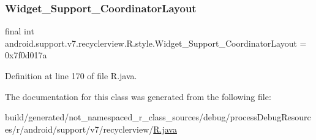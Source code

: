 \subsubsection{\texorpdfstring{Widget\_Support\_CoordinatorLayout}{Widget\_Support\_CoordinatorLayout}}
{\footnotesize\ttfamily final int android.\+support.\+v7.\+recyclerview.\+R.\+style.\+Widget\+\_\+\+Support\+\_\+\+Coordinator\+Layout = 0x7f0d017a\hspace{0.3cm}{\ttfamily [static]}}



Definition at line 170 of file R.\+java.



The documentation for this class was generated from the following file\+:\begin{DoxyCompactItemize}
\item 
build/generated/not\+\_\+namespaced\+\_\+r\+\_\+class\+\_\+sources/debug/process\+Debug\+Resources/r/android/support/v7/recyclerview/\mbox{\hyperlink{android_2support_2v7_2recyclerview_2_r_8java}{R.\+java}}\end{DoxyCompactItemize}
